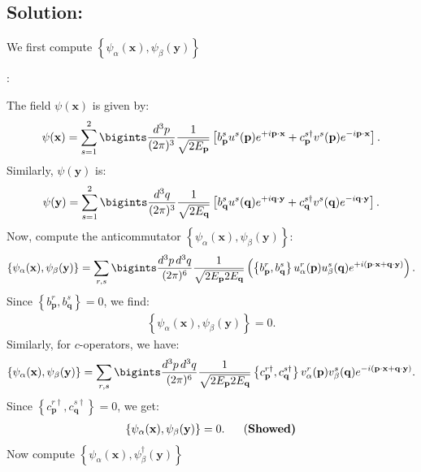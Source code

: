 {\subsection*{Solution:}
We first compute $\left\{\psi_\alpha(\mathbf{x}), \psi_\beta(\mathbf{y})\right\}$}:

The field $\psi(\mathbf{x})$ is given by:
\begin{align*}
    \psi(\mathbf{x}) = \sum_{s=1}^2 \bigints\frac{d^3p}{(2\pi)^3} \frac{1}{\sqrt{2E_{\mathbf{p}}}} \left[ b^s_{\mathbf{p}} u^s(\mathbf{p}) e^{+i\mathbf{p}\cdot\mathbf{x}} + c^{s\dagger}_{\mathbf{p}} v^s(\mathbf{p}) e^{-i\mathbf{p}\cdot\mathbf{x}} \right].
\end{align*}
Similarly, $\psi(\mathbf{y})$ is:
\begin{align*}
    \psi(\mathbf{y}) = \sum_{s=1}^2 \bigints\frac{d^3q}{(2\pi)^3} \frac{1}{\sqrt{2E_{\mathbf{q}}}} \left[ b^s_{\mathbf{q}} u^s(\mathbf{q}) e^{+i\mathbf{q}\cdot\mathbf{y}} + c^{s\dagger}_{\mathbf{q}} v^s(\mathbf{q}) e^{-i\mathbf{q}\cdot\mathbf{y}} \right].
\end{align*}
Now, compute the anticommutator $\left\{\psi_\alpha(\mathbf{x}), \psi_\beta(\mathbf{y})\right\}$:
\begin{align*}
    \left\{\psi_\alpha(\mathbf{x}), \psi_\beta(\mathbf{y})\right\} = \sum_{r,s} \bigints\frac{d^3p \, d^3q}{(2\pi)^6} \frac{1}{\sqrt{2E_{\mathbf{p}} 2E_{\mathbf{q}}}} \left( \left\{b^r_{\mathbf{p}}, b^s_{\mathbf{q}}\right\} u^r_\alpha(\mathbf{p}) u^s_\beta(\mathbf{q}) e^{+i(\mathbf{p}\cdot\mathbf{x} + \mathbf{q}\cdot\mathbf{y})} \right).
\end{align*}
Since $\left\{b^r_{\mathbf{p}}, b^s_{\mathbf{q}}\right\} = 0$, we find:
\begin{align*}
    \left\{\psi_\alpha(\mathbf{x}), \psi_\beta(\mathbf{y})\right\} = 0.
\end{align*}
Similarly, for $c$-operators, we have:
\begin{align*}
    \left\{\psi_\alpha(\mathbf{x}), \psi_\beta(\mathbf{y})\right\} = \sum_{r,s} \bigints\frac{d^3p \, d^3q}{(2\pi)^6} \frac{1}{\sqrt{2E_{\mathbf{p}} 2E_{\mathbf{q}}}} \left\{c^{r\dagger}_{\mathbf{p}}, c^{s\dagger}_{\mathbf{q}}\right\} v^r_\alpha(\mathbf{p}) v^s_\beta(\mathbf{q}) e^{-i(\mathbf{p}\cdot\mathbf{x} + \mathbf{q}\cdot\mathbf{y})}.
\end{align*}
Since $\left\{c^{r\dagger}_{\mathbf{p}}, c^{s\dagger}_{\mathbf{q}}\right\} = 0$, we get:
\begin{align}
    \left\{\psi_\alpha(\mathbf{x}), \psi_\beta(\mathbf{y})\right\} = 0.~~~~~\text{(\bf Showed)}
\end{align}
Now compute $\left\{\psi_\alpha(\mathbf{x}), \psi^\dagger_\beta(\mathbf{y})\right\}$

